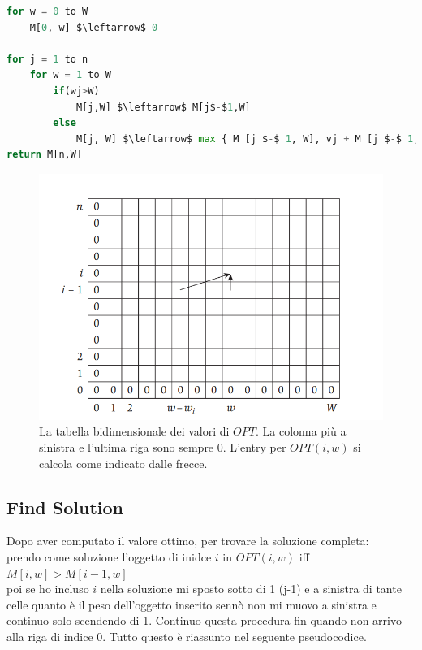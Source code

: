 \begin{lstlisting}[language=Python, mathescape=true]
for w = 0 to W 
	M[0, w] $\leftarrow$ 0
	
for j = 1 to n
	for w = 1 to W
		if(wj>W) 
			M[j,W] $\leftarrow$ M[j$-$1,W]
		else 
			M[j, W] $\leftarrow$ max { M [j $-$ 1, W], vj + M [j $-$ 1, W $-$ wj] }
return M[n,W]
\end{lstlisting}
\begin{figure}[H]
  \centering
  \includegraphics[width = 15cm, keepaspectratio]{Programmazione_dinamica/imgs/knapsack_opt.png}
  \caption{La tabella bidimensionale dei valori di $OPT$.
    La colonna più a sinistra e l'ultima riga sono sempre 0. L'entry
    per $OPT(i, w)$ si calcola come indicato dalle frecce.}
\end{figure}


\subsection{Find Solution}

Dopo aver computato il valore ottimo, per trovare la soluzione completa:\\

prendo come soluzione l'oggetto di inidce $i$ in $OPT(i, w)$ iff
$M[i, w] > M[i-1, w]$\\

poi se ho incluso $i$ nella soluzione mi sposto sotto di 1 (j-1) e a
sinistra di tante celle quanto è il peso dell'oggetto inserito sennò non
mi muovo a sinistra e continuo solo scendendo di 1. Continuo questa
procedura fin quando non arrivo alla riga di indice 0. Tutto questo è
riassunto nel seguente pseudocodice.

